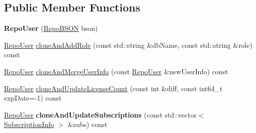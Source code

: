 \subsection*{Public Member Functions}
\begin{DoxyCompactItemize}
\item 
\hypertarget{classrepo_1_1core_1_1model_1_1_repo_user_aea1084a6836596ae2d6b27659c16414a}{}{\bfseries Repo\+User} (\hyperlink{classrepo_1_1core_1_1model_1_1_repo_b_s_o_n}{Repo\+B\+S\+O\+N} bson)\label{classrepo_1_1core_1_1model_1_1_repo_user_aea1084a6836596ae2d6b27659c16414a}

\item 
\hyperlink{classrepo_1_1core_1_1model_1_1_repo_user}{Repo\+User} \hyperlink{classrepo_1_1core_1_1model_1_1_repo_user_a978b5e38fa9b11b40ecd22f16e9cebc4}{clone\+And\+Add\+Role} (const std\+::string \&db\+Name, const std\+::string \&role) const 
\item 
\hyperlink{classrepo_1_1core_1_1model_1_1_repo_user}{Repo\+User} \hyperlink{classrepo_1_1core_1_1model_1_1_repo_user_a2cdeca59b63e766e326df7b7c3c759dd}{clone\+And\+Merge\+User\+Info} (const \hyperlink{classrepo_1_1core_1_1model_1_1_repo_user}{Repo\+User} \&new\+User\+Info) const 
\item 
\hyperlink{classrepo_1_1core_1_1model_1_1_repo_user}{Repo\+User} \hyperlink{classrepo_1_1core_1_1model_1_1_repo_user_a90a5c1918e73e66d3b23614e0696f00d}{clone\+And\+Update\+License\+Count} (const int \&diff, const int64\+\_\+t exp\+Date=-\/1) const 
\item 
\hypertarget{classrepo_1_1core_1_1model_1_1_repo_user_a8a71e9f1c1831f78eec3334e86538480}{}\hyperlink{classrepo_1_1core_1_1model_1_1_repo_user}{Repo\+User} {\bfseries clone\+And\+Update\+Subscriptions} (const std\+::vector$<$ \hyperlink{structrepo_1_1core_1_1model_1_1_repo_user_1_1_subscription_info}{Subscription\+Info} $>$ \&subs) const \label{classrepo_1_1core_1_1model_1_1_repo_user_a8a71e9f1c1831f78eec3334e86538480}


\end{DoxyCompactItemize}
